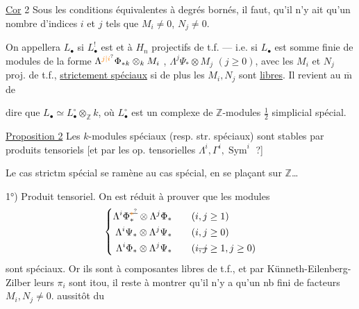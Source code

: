 \uline{Cor} 2 Sous les conditions équivalentes     à degrés bornés, il faut\unsure{)}, qu'il n'y ait qu'un nombre  d'indices $i$ et $j$ tels que $M_i\ne0$, $N_j\ne0$.

 On appellera  $L_{\bullet}$     si $L_{\bullet}^!$ est   et à $H_n$ projectifs de t.f. --- i.e. si $L_{\bullet}$ est \inserted{$\simeq$} somme finie de modules de la forme  $\Lambda^{\unsure{j|i}}\Phi_{*k}\otimes_k M_i$ , $\Lambda^j\Psi_*\otimes M_j$ $(j\geq0)$, avec les $M_i$ et $N_j$ proj. de t.f., \uline{strictement spéciaux} si de plus les $M_i,N_j$ sont \uline{libres}. Il revient au $\overline{\mathrm m}$ de

dire que $L_{\bullet}\simeq L_{\bullet}^{\circ}\otimes_{\mathbb Z}k$, où $L_{\bullet}^{\circ}$ est un complexe de $\mathbb Z$-modules $\frac12$ simplicial spécial.

\uline{Proposition 2} Les $k$-modules  spéciaux (resp. str. spéciaux) sont stables par produits tensoriels [et par les op. tensorielles $\Lambda^i,\Gamma^i,\operatorname{Sym}^i$ ?]

Le cas strictm spécial se ramène au cas spécial, en se plaçant sur $\mathbb Z$\ldots

1°) Produit tensoriel. On est réduit à prouver que les modules
\[
\left\{\begin{aligned}
\Lambda^i\Phi_*^{\deleted{\unsure{*}}}\otimes\Lambda^j\Phi_* &\qquad(i,j\geq1)\\
\Lambda^i\Psi_*\otimes\Lambda^j\Psi_* &\qquad(i,j\geq0)\\
\Lambda^i\Phi_*\otimes\Lambda^j\Psi_* &\qquad(i\deleted{,j}\geq1,j\geq0)
\end{aligned}\right.
\]
sont spéciaux. Or ils sont à composantes libres de t.f., et par Künneth-Eilenberg-Zilber leurs $\pi_i$ sont itou, il reste à montrer qu'il n'y a qu'un nb fini de facteurs $M_i,N_j\ne0$.    aussitôt du

